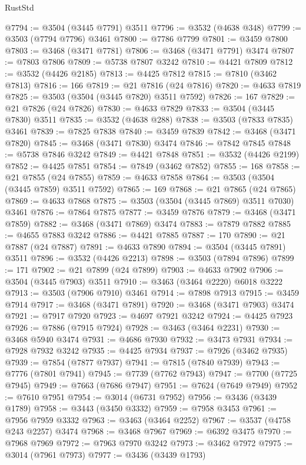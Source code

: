 \begin{lexlean}{RustStd}
\begin{coremodule}
@7794 := @3504 (@3445 @7791) @3511
@7796 := @3532 (@4638 @348)
@7799 := @3503 (@7794 @7796) @3461
@7800 := @7786 @7799
@7801 := @3459 @7800
@7803 := @3468 (@3471 @7781)
@7806 := @3468 (@3471 @7791) @3474
@7807 := @7803 @7806
@7809 := @5738 @7807 @3242
@7810 := @4421 @7809
@7812 := @3532 (@4426 @2185)
@7813 := @4425 @7812
@7815 := @7810 (@3462 @7813)
@7816 := 166
@7819 := @21 @7816 (@24 @7816)
@7820 := @4633 @7819
@7825 := @3503 (@3504 (@3445 @7820) @3511 @7592)
@7826 := 167
@7829 := @21 @7826 (@24 @7826)
@7830 := @4633 @7829
@7833 := @3504 (@3445 @7830) @3511
@7835 := @3532 (@4638 @288)
@7838 := @3503 (@7833 @7835) @3461
@7839 := @7825 @7838
@7840 := @3459 @7839
@7842 := @3468 (@3471 @7820)
@7845 := @3468 (@3471 @7830) @3474
@7846 := @7842 @7845
@7848 := @5738 @7846 @3242
@7849 := @4421 @7848
@7851 := @3532 (@4426 @2199)
@7852 := @4425 @7851
@7854 := @7849 (@3462 @7852)
@7855 := 168
@7858 := @21 @7855 (@24 @7855)
@7859 := @4633 @7858
@7864 := @3503 (@3504 (@3445 @7859) @3511 @7592)
@7865 := 169
@7868 := @21 @7865 (@24 @7865)
@7869 := @4633 @7868
@7875 := @3503 (@3504 (@3445 @7869) @3511 @7030) @3461
@7876 := @7864 @7875
@7877 := @3459 @7876
@7879 := @3468 (@3471 @7859)
@7882 := @3468 (@3471 @7869) @3474
@7883 := @7879 @7882
@7885 := @4655 @7883 @3242
@7886 := @4421 @7885
@7887 := 170
@7890 := @21 @7887 (@24 @7887)
@7891 := @4633 @7890
@7894 := @3504 (@3445 @7891) @3511
@7896 := @3532 (@4426 @2213)
@7898 := @3503 (@7894 @7896)
@7899 := 171
@7902 := @21 @7899 (@24 @7899)
@7903 := @4633 @7902
@7906 := @3504 (@3445 @7903) @3511
@7910 := @3463 (@3464 @2220) @6018 @3222
@7913 := @3503 (@7906 @7910) @3461
@7914 := @7898 @7913
@7915 := @3459 @7914
@7917 := @3468 (@3471 @7891)
@7920 := @3468 (@3471 @7903) @3474
@7921 := @7917 @7920
@7923 := @4697 @7921 @3242
@7924 := @4425 @7923
@7926 := @7886 (@7915 @7924)
@7928 := @3463 (@3464 @2231)
@7930 := @3468 @5940 @3474
@7931 := @4686 @7930
@7932 := @3473 @7931
@7934 := @7928 @7932 @3242
@7935 := @4425 @7934
@7937 := @7926 (@3462 @7935)
@7939 := @7854 (@7877 @7937)
@7941 := @7815 (@7840 @7939)
@7943 := @7776 (@7801 @7941)
@7945 := @7739 (@7762 @7943)
@7947 := @7700 (@7725 @7945)
@7949 := @7663 (@7686 @7947)
@7951 := @7624 (@7649 @7949)
@7952 := @7610 @7951
@7954 := @3014 (@6731 @7952)
@7956 := @3436 (@3439 @1789)
@7958 := @3443 (@3450 @3332)
@7959 := @7958 @3453
@7961 := @7956 @7959 @3332
@7963 := @3463 (@3464 @2252)
@7967 := @3537 (@4758 @243 @2257) @3474
@7968 := @3468 @7967
@7969 := @6392 @3475
@7970 := @7968 @7969
@7972 := @7963 @7970 @3242
@7973 := @3462 @7972
@7975 := @3014 (@7961 @7973)
@7977 := @3436 (@3439 @1793)

\end{coremodule}
\end{lexlean}
